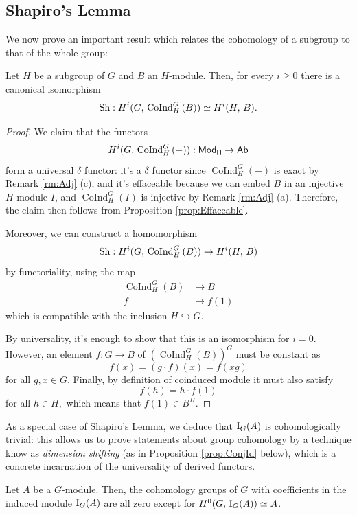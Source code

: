 \documentclass[a4paper, oneside]{memoir}
\begin{document}
\subsection{Shapiro's Lemma}
We now prove an important result which relates the cohomology of a subgroup to that of the whole group:
\begin{theorem}\label{thm:Shapiro}
	Let $H$ be a subgroup of $G$ and $B$ an $H$-module. Then, for every $i\geq0$ there is a canonical isomorphism
	\[
		\operatorname{Sh}: H^{i}( G, \, \operatorname{CoInd}^G_H{(B)} )\simeq H^{i}( H, \, B ).
	\]
\end{theorem}
\begin{proof}
	We claim that the functors
	\[
		H^{i}( G, \, \operatorname{CoInd}^G_H{(-)} ): \mathsf{Mod}_\mathsf{H}\to\mathsf{Ab}
	\]
	form a universal $\delta$ functor: it's a $\delta$ functor since $\operatorname{CoInd}^G_H{(-)}$ is exact by Remark \ref{rm:Adj} (c), and it's effaceable because we can embed $B$ in an injective $H$-module $I$, and $\operatorname{CoInd}^G_H{(I)}$ is injective by Remark \ref{rm:Adj} (a).
	Therefore, the claim then follows from Proposition \ref{prop:Effaceable}.

	Moreover, we can construct a homomorphism
	\[
		\operatorname{Sh}: H^{i}( G, \, \operatorname{CoInd}^G_H{(B)} )\to H^{i}( H, \, B )
	\]
	by functoriality, using the map
	\begin{align*}
		\operatorname{CoInd}^G_H{(B)} & \to B        \\
		f                             & \mapsto f(1)
	\end{align*}
	which is compatible with the inclusion $H\hookrightarrow G$.

	By universality, it's enough to show that this is an isomorphism for $i=0$. However, an element $f:G\to B$ of $(\operatorname{CoInd}^G_H{(B)})^G$ must be constant as \[f(x)=(g\cdot f)(x)=f(xg)\] for all $g,x\in G$. Finally, by definition of coinduced module it must also satisfy \[f(h)=h\cdot f(1)\] for all $h\in H,$ which means that $f(1)\in B^H$.
\end{proof}

As a special case of Shapiro's Lemma, we deduce that $\operatorname{I}_{G}(A)$ is cohomologically trivial: this allows us to prove statements about group cohomology by a technique know as \textit{dimension
	shifting} (as in Proposition \ref{prop:ConjId} below), which is a concrete incarnation of the universality of derived functors.
\begin{corollary}\label{cor:IndMod}
	Let $A$ be a $G$-module. Then, the cohomology groups of $G$ with coefficients in the induced module $\operatorname{I}_{G}(A)$ are all zero except for $H^{0}( G, \, \operatorname{I}_{G}(A) )\simeq A$.
\end{corollary}
\end{document}
